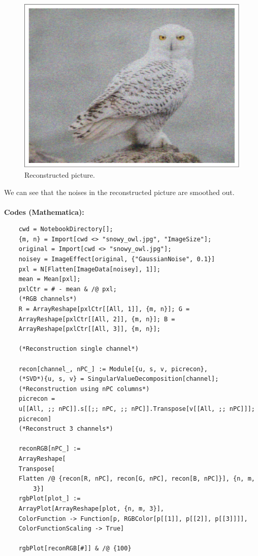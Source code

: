 \documentclass[11pt]{article}
\begin{document}
\begin{figure}[H] %
	\centering\includegraphics[width=0.6\linewidth]{snowy_owl_recon.png}
	\caption{Reconstructed picture.} %
	\label{fig:fig6}  %
\end{figure}
We can see that the noises in the reconstructed picture are smoothed out.\\\\
\textbf{Codes (Mathematica):}
\begin{verbatim}
	cwd = NotebookDirectory[];
	{m, n} = Import[cwd <> "snowy_owl.jpg", "ImageSize"];
	original = Import[cwd <> "snowy_owl.jpg"];
	noisey = ImageEffect[original, {"GaussianNoise", 0.1}]
	pxl = N[Flatten[ImageData[noisey], 1]];
	mean = Mean[pxl];
	pxlCtr = # - mean & /@ pxl;
	(*RGB channels*)
	R = ArrayReshape[pxlCtr[[All, 1]], {m, n}]; G = 
	ArrayReshape[pxlCtr[[All, 2]], {m, n}]; B = 
	ArrayReshape[pxlCtr[[All, 3]], {m, n}];
	
	(*Reconstruction single channel*)
	
	recon[channel_, nPC_] := Module[{u, s, v, picrecon},
	(*SVD*){u, s, v} = SingularValueDecomposition[channel];
	(*Reconstruction using nPC columns*)
	picrecon = 
	u[[All, ;; nPC]].s[[;; nPC, ;; nPC]].Transpose[v[[All, ;; nPC]]];
	picrecon]
	(*Reconstruct 3 channels*)
	
	reconRGB[nPC_] := 
	ArrayReshape[
	Transpose[
	Flatten /@ {recon[R, nPC], recon[G, nPC], recon[B, nPC]}], {n, m, 
		3}]
	rgbPlot[plot_] := 
	ArrayPlot[ArrayReshape[plot, {n, m, 3}], 
	ColorFunction -> Function[p, RGBColor[p[[1]], p[[2]], p[[3]]]], 
	ColorFunctionScaling -> True]
	
	rgbPlot[reconRGB[#]] & /@ {100}
\end{verbatim}


\newpage
\end{document}
